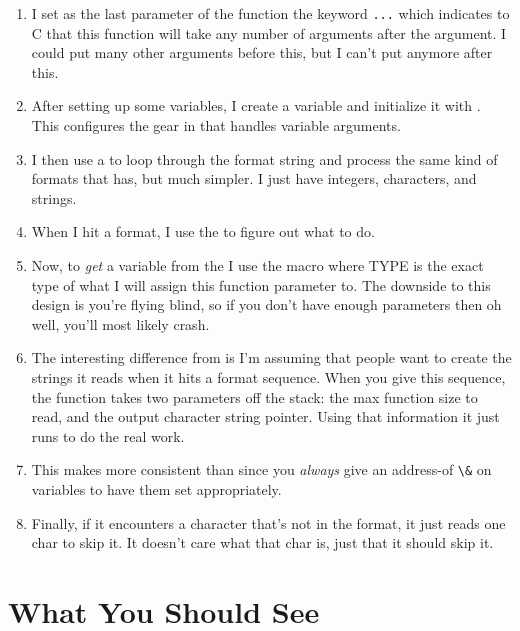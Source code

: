 \begin{enumerate}
\item I set as the last parameter of the function the keyword \verb|...|
    which indicates to C that this function will take any number of arguments
    after the  argument.  I could put many other arguments before
    this, but I can't put anymore after this.
\item After setting up some variables, I create a  variable
    and initialize it with .  This configures the gear
    in  that handles variable arguments.
\item I then use a  to loop through the format string
     and process the same kind of formats that 
    has, but much simpler.  I just have integers, characters, and strings.
\item When I hit a format, I use the  to figure out
    what to do.
\item Now, to \emph{get} a variable from the  I use the
    macro  where TYPE is the exact type of what
    I will assign this function parameter to.  The downside to this design
    is you're flying blind, so if you don't have enough parameters then
    oh well, you'll most likely crash.
\item The interesting difference from  is I'm assuming that people
    want  to create the strings it reads when it hits a
     format sequence.  When you give this sequence, the function
    takes two parameters off the  stack: the max function
    size to read, and the output character string pointer.  Using that information
    it just runs  to do the real work.
\item This makes  more consistent than  since you
    \emph{always} give an address-of \verb|\&| on variables to have them set
    appropriately.
\item Finally, if it encounters a character that's not in the format, it just reads
    one char to skip it.  It doesn't care what that char is, just that it should
    skip it.
\end{enumerate}


\section{What You Should See}


